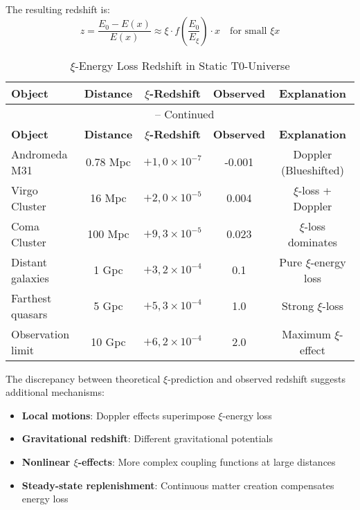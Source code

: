 \documentclass[12pt,a4paper]{article}
\theoremstyle{definition}
\begin{document}
	The resulting redshift is:
	\begin{equation}
		z = \frac{E_0 - E(x)}{E(x)} \approx \xi \cdot f\left(\frac{E_0}{E_\xi}\right) \cdot x \quad \text{for small } \xi x
	\end{equation}
	
	\begin{longtable}{lcccc}
		\caption{$\xi$-Energy Loss Redshift in Static T0-Universe} \\
		\toprule
		\textbf{Object} & \textbf{Distance} & \textbf{$\xi$-Redshift} & \textbf{Observed} & \textbf{Explanation} \\
		\midrule
		\endfirsthead
		\multicolumn{5}{c}{\tablename\ \thetable{} -- Continued} \\
		\toprule
		\textbf{Object} & \textbf{Distance} & \textbf{$\xi$-Redshift} & \textbf{Observed} & \textbf{Explanation} \\
		\midrule
		\endhead
		Andromeda M31 & 0.78 Mpc & $+1{,}0 \times 10^{-7}$ & -0.001 & Doppler (Blueshifted) \\
		Virgo Cluster & 16 Mpc & $+2{,}0 \times 10^{-5}$ & 0.004 & $\xi$-loss + Doppler \\
		Coma Cluster & 100 Mpc & $+9{,}3 \times 10^{-5}$ & 0.023 & $\xi$-loss dominates \\
		Distant galaxies & 1 Gpc & $+3{,}2 \times 10^{-4}$ & 0.1 & Pure $\xi$-energy loss \\
		Farthest quasars & 5 Gpc & $+5{,}3 \times 10^{-4}$ & 1.0 & Strong $\xi$-loss \\
		Observation limit & 10 Gpc & $+6{,}2 \times 10^{-4}$ & 2.0 & Maximum $\xi$-effect \\
		\bottomrule
	\end{longtable}
	
	\begin{important}
		The discrepancy between theoretical $\xi$-prediction and observed redshift suggests additional mechanisms:
		\begin{itemize}
			\item \textbf{Local motions}: Doppler effects superimpose $\xi$-energy loss
			\item \textbf{Gravitational redshift}: Different gravitational potentials
			\item \textbf{Nonlinear $\xi$-effects}: More complex coupling functions at large distances
			\item \textbf{Steady-state replenishment}: Continuous matter creation compensates energy loss
		\end{itemize}
	\end{important}
	
\end{document}
